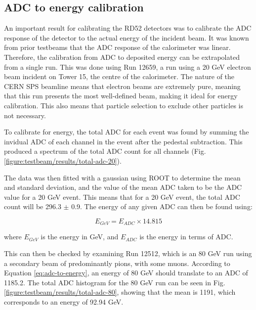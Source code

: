 \subsection{ADC to energy calibration}
An important result for calibrating the RD52 detectors was to calibrate the \acrshort{ADC} response of the detector to the actual energy of the incident beam. It was known from prior testbeams that the \acrshort{ADC} response of the calorimeter was linear. Therefore, the calibration from \acrshort{ADC} to deposited energy can be extrapolated from a single run. This was done using Run 12659, a run using a 20 GeV electron beam incident on Tower 15, the centre of the calorimeter. The nature of the \acrshort{CERN} \acrshort{SPS} beamline means that electron beams are extremely pure, meaning that this run presents the most well-defined beam, making it ideal for energy calibration. This also means that particle selection to exclude other particles is not necessary.

To calibrate for energy, the total \acrshort{ADC} for each event was found by summing the invidual \acrshort{ADC} of each channel in the event after the pedestal subtraction. This produced a spectrum of the total \acrshort{ADC} count for all channels (Fig. \ref{figure:testbeam/results/total-adc-20}).

The data was then fitted with a gaussian using ROOT to determine the mean and standard deviation, and the value of the mean \acrshort{ADC} taken to be the \acrshort{ADC} value for a 20 GeV event. This means that for a 20 GeV event, the total \acrshort{ADC} count will be 296.3 $\pm$ 0.9. The energy of any given ADC can then be found using:

\begin{equation}
	E_{GeV} = E_{ADC} \times 14.815
\label{eq:adc-to-energy}
\end{equation}

where $E_{GeV}$ is the energy in GeV, and $E_{ADC}$ is the energy in terms of ADC.

This can then be checked by examining Run 12512, which is an 80 GeV run using a secondary beam of predominantly pions, with some muons. According to Equation \ref{eq:adc-to-energy}, an energy of 80 GeV should translate to an ADC of 1185.2. The total ADC histogram for the 80 GeV run can be seen in Fig. \ref{figure:testbeam/results/total-adc-80}, showing that the mean is 1191, which corresponds to an energy of 92.94 GeV.

%

